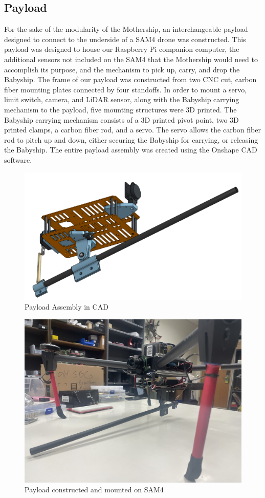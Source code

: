 \documentclass[11pt]{article}
\begin{document}
\subsection{Payload}
For the sake of the modularity of the Mothership, an interchangeable payload designed to connect to the underside of a SAM4 drone was constructed. This payload was designed to house our Raspberry Pi companion computer, the additional sensors not included on the SAM4 that the Mothership would need to accomplish its purpose, and the mechanism to pick up, carry, and drop the Babyship. The frame of our payload was constructed from two CNC cut, carbon fiber mounting plates connected by four standoffs. In order to mount a servo, limit switch, camera, and LiDAR sensor, along with the Babyship carrying mechanism to the payload, five mounting structures were 3D printed. The Babyship carrying mechanism consists of a 3D printed pivot point, two 3D printed clamps, a carbon fiber rod, and a servo. The servo allows the carbon fiber rod to pitch up and down, either securing the Babyship for carrying, or releasing the Babyship. The entire payload assembly was created using the Onshape CAD software.
\begin{figure}[h]
    \centering
    \includegraphics[scale=0.3]{Payload_Assembly.png}
    \caption{Payload Assembly in CAD}
\end{figure}
\begin{figure}[htp]
    \centering
    \includegraphics[scale=0.2]{Payload_Constructed.png}
    \caption{Payload constructed and mounted on SAM4}
\end{figure}
\end{document}
